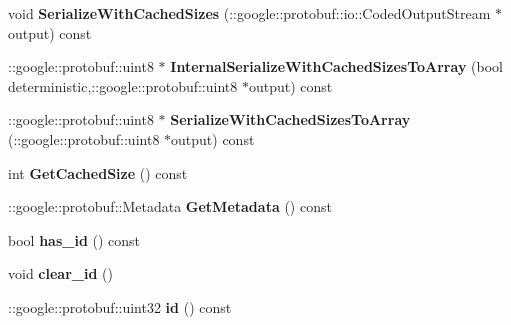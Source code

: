 \begin{DoxyCompactItemize}
\item 
void {\bfseries Serialize\+With\+Cached\+Sizes} (\+::google\+::protobuf\+::io\+::\+Coded\+Output\+Stream $\ast$output) const \hypertarget{classvss__command_1_1Global__Commands_a35292dbb1e0ac73f11bedc01a64e751e}{}\label{classvss__command_1_1Global__Commands_a35292dbb1e0ac73f11bedc01a64e751e}

\item 
\+::google\+::protobuf\+::uint8 $\ast$ {\bfseries Internal\+Serialize\+With\+Cached\+Sizes\+To\+Array} (bool deterministic,\+::google\+::protobuf\+::uint8 $\ast$output) const \hypertarget{classvss__command_1_1Global__Commands_a68d33135851d0d816141df590ddf789a}{}\label{classvss__command_1_1Global__Commands_a68d33135851d0d816141df590ddf789a}

\item 
\+::google\+::protobuf\+::uint8 $\ast$ {\bfseries Serialize\+With\+Cached\+Sizes\+To\+Array} (\+::google\+::protobuf\+::uint8 $\ast$output) const \hypertarget{classvss__command_1_1Global__Commands_a410002d27fea7d706ebf87bbf1fb74c5}{}\label{classvss__command_1_1Global__Commands_a410002d27fea7d706ebf87bbf1fb74c5}

\item 
int {\bfseries Get\+Cached\+Size} () const \hypertarget{classvss__command_1_1Global__Commands_a87d23baa19f2c0272a75e15dfa234f08}{}\label{classvss__command_1_1Global__Commands_a87d23baa19f2c0272a75e15dfa234f08}

\item 
\+::google\+::protobuf\+::\+Metadata {\bfseries Get\+Metadata} () const \hypertarget{classvss__command_1_1Global__Commands_ae82e1f8fbfdf6f364c915da6d0e12f33}{}\label{classvss__command_1_1Global__Commands_ae82e1f8fbfdf6f364c915da6d0e12f33}

\item 
bool {\bfseries has\+\_\+id} () const \hypertarget{classvss__command_1_1Global__Commands_a70a923cca7611e0bd3c322a1ac5e91ba}{}\label{classvss__command_1_1Global__Commands_a70a923cca7611e0bd3c322a1ac5e91ba}

\item 
void {\bfseries clear\+\_\+id} ()\hypertarget{classvss__command_1_1Global__Commands_a32c51afe77b984a2be61e786893dd382}{}\label{classvss__command_1_1Global__Commands_a32c51afe77b984a2be61e786893dd382}

\item 
\+::google\+::protobuf\+::uint32 {\bfseries id} () const \hypertarget{classvss__command_1_1Global__Commands_ac4b50f174ae21e1ef747b8d2498d9651}{}\label{classvss__command_1_1Global__Commands_ac4b50f174ae21e1ef747b8d2498d9651}


\end{DoxyCompactItemize}
